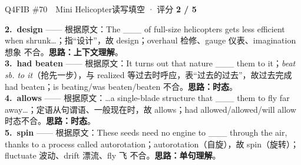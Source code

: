 \begin{qblock}{Q4\quad FIB \#70\ \ Mini Helicopter}{读写填空 · 评分 \textcolor{cAccent}{\bfseries 2 / 5}}
\begin{notebox}
\textbf{2.\ design} —— 根据原文：The \_\_\_ of full-size helicopters gets less efficient when shrunk…；指“设计”，故 design；overhaul 检修、gauge 仪表、imagination 想象 不合。\textbf{思路：上下文理解}。\\[2pt]
\textbf{3.\ had beaten} —— 根据原文：It turns out that nature \_\_\_ them to it；\emph{beat sb. to it}（抢先一步），与 realized 等过去时呼应，表“过去的过去”，故过去完成 had beaten；is beating/was beaten/beaten 不合。\textbf{思路：时态}。\\[2pt]
\textbf{4.\ allows} —— 根据原文：…a single-blade structure that \_\_\_ them to fly far away…；定语从句谓语、一般现在时，故 allows；had allowed/allowed/will allow 时态不合。\textbf{思路：时态}。\\[2pt]
\textbf{5.\ spin} —— 根据原文：These seeds need no engine to \_\_\_ through the air, thanks to a process called autorotation；autorotation（自旋），故 spin（旋转）；fluctuate 波动、drift 漂流、fly 飞 不合。\textbf{思路：单句理解}。
\end{notebox}
\end{qblock}

